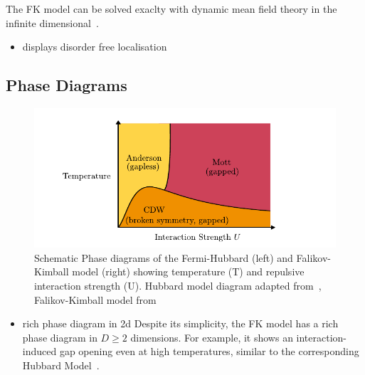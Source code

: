 The FK model can be solved exaclty with dynamic mean field theory in the infinite dimensional~\autocite{antipovCriticalExponentsStrongly2014,ribicNonlocalCorrelationsSpectral2016,freericksExactDynamicalMeanfield2003,herrmannNonequilibriumDynamicalCluster2016}.

\begin{itemize}
\tightlist
\item
  displays disorder free localisation
\end{itemize}

\hypertarget{phase-diagrams}{%
\subsection{Phase Diagrams}\label{phase-diagrams}}

\hypertarget{fig:fk_phase_diagram}{%
\begin{figure}
\centering
\includegraphics[width=1\textwidth,height=\textheight]{figure_code/background_chapter/fk_phase_diagram}
\caption[{Fermi-Hubbard and Falikov-Kimball Temperatue-Interaction Phase Diagrams}]{Schematic Phase diagrams of the Fermi-Hubbard (left) and Falikov-Kimball model (right) showing temperature (T) and repulsive interaction strength (U). Hubbard model diagram adapted from~\autocite{micnasSuperconductivityNarrowbandSystems1990}, Falikov-Kimball model from~\autocite{antipovInteractionTunedAndersonMott2016,antipovCriticalExponentsStrongly2014}}
\label{fig:fk_phase_diagram}
\end{figure}
}

\begin{itemize}
\tightlist
\item
  rich phase diagram in 2d Despite its simplicity, the FK model has a rich phase diagram in \(D \geq 2\) dimensions. For example, it shows an interaction-induced gap opening even at high temperatures, similar to the corresponding Hubbard Model~\autocite{brandtThermodynamicsCorrelationFunctions1989}.
\end{itemize}

